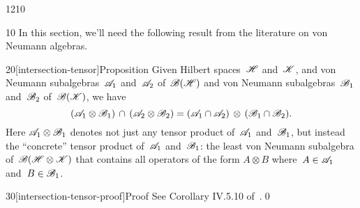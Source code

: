 \begin{parsec}{1210}%
\begin{point}{10}%
In this section,
we'll need the following result
from the literature on von Neumann algebras.
\end{point}
\begin{point}{20}[intersection-tensor]{Proposition}%
Given Hilbert spaces~$\mathscr{H}$ and~$\mathscr{K}$,
and von Neumann subalgebras~$\mathscr{A}_1$ and~$\mathscr{A}_2$
of~$\mathscr{B}(\mathscr{H})$
and von Neumann subalgebras~$\mathscr{B}_1$ and~$\mathscr{B}_2$
of~$\mathscr{B}(\mathscr{K})$,
we have 
\begin{equation*}
(\mathscr{A}_1 \otimes  \mathscr{B}_1)\,\cap\,
(\mathscr{A}_2 \otimes \mathscr{B}_2)
= (\mathscr{A}_1\cap\mathscr{A}_2)\,\otimes\,
(\mathscr{B}_1\cap \mathscr{B}_2).
\end{equation*}
Here
$\mathscr{A}_1 \otimes \mathscr{B}_1$
denotes not just any tensor product of~$\mathscr{A}_1$ and~$\mathscr{B}_1$,
but instead
the ``concrete'' tensor product 
of~$\mathscr{A}_1$ and~$\mathscr{B}_1$:
the least von Neumann subalgebra of~$\mathscr{B}(\mathscr{H}\otimes\mathscr{K})$
that contains all operators
of the form $A\otimes B$ where~$A\in\mathscr{A}_1$
and~$B\in\mathscr{B}_1$.
\begin{point}{30}[intersection-tensor-proof]{Proof}%
See Corollary IV.5.10 of~\cite{Takesaki1}.\qed
\end{point}
\end{point}
\end{parsec}
